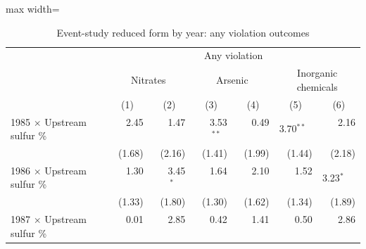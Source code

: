 \begin{table}[htbp]
\raggedright
\begin{minipage}{\linewidth}
\caption{\label{tab:es_rf_coefs_allcat_k2} Event-study reduced form by year: any violation outcomes}
\end{minipage}
\small
{\setlength{\tabcolsep}{4pt}%
\begin{adjustbox}{max width=\linewidth}
\begin{tabular}{lrrrrrr}
\toprule
 & \multicolumn{6}{c}{Any violation} \\
 & \multicolumn{2}{c}{Nitrates} & \multicolumn{2}{c}{Arsenic} & \multicolumn{2}{c}{Inorganic chemicals} \\
 & \multicolumn{1}{c}{(1)} & \multicolumn{1}{c}{(2)} & \multicolumn{1}{c}{(3)} & \multicolumn{1}{c}{(4)} & \multicolumn{1}{c}{(5)} & \multicolumn{1}{c}{(6)} \\
\hline
1985 $\times$ Upstream sulfur \% & \phantom{(}\phantom{-}2.45$^{\phantom{*}\phantom{*}\phantom{*}}$ & \phantom{(}\phantom{-}1.47$^{\phantom{*}\phantom{*}\phantom{*}}$ & \phantom{(}\phantom{-}3.53$^{**\phantom{*}}$ & \phantom{(}\phantom{-}0.49$^{\phantom{*}\phantom{*}\phantom{*}}$ & \phantom{(}\phantom{-}3.70$^{**\phantom{*}}$ & \phantom{(}\phantom{-}2.16$^{\phantom{*}\phantom{*}\phantom{*}}$ \\
 & (\phantom{-}1.68)\phantom{$^{***}$} & (\phantom{-}2.16)\phantom{$^{***}$} & (\phantom{-}1.41)\phantom{$^{***}$} & (\phantom{-}1.99)\phantom{$^{***}$} & (\phantom{-}1.44)\phantom{$^{***}$} & (\phantom{-}2.18)\phantom{$^{***}$} \\
1986 $\times$ Upstream sulfur \% & \phantom{(}\phantom{-}1.30$^{\phantom{*}\phantom{*}\phantom{*}}$ & \phantom{(}\phantom{-}3.45$^{*\phantom{*}\phantom{*}}$ & \phantom{(}\phantom{-}1.64$^{\phantom{*}\phantom{*}\phantom{*}}$ & \phantom{(}\phantom{-}2.10$^{\phantom{*}\phantom{*}\phantom{*}}$ & \phantom{(}\phantom{-}1.52$^{\phantom{*}\phantom{*}\phantom{*}}$ & \phantom{(}\phantom{-}3.23$^{*\phantom{*}\phantom{*}}$ \\
 & (\phantom{-}1.33)\phantom{$^{***}$} & (\phantom{-}1.80)\phantom{$^{***}$} & (\phantom{-}1.30)\phantom{$^{***}$} & (\phantom{-}1.62)\phantom{$^{***}$} & (\phantom{-}1.34)\phantom{$^{***}$} & (\phantom{-}1.89)\phantom{$^{***}$} \\
1987 $\times$ Upstream sulfur \% & \phantom{(}\phantom{-}0.01$^{\phantom{*}\phantom{*}\phantom{*}}$ & \phantom{(}\phantom{-}2.85$^{\phantom{*}\phantom{*}\phantom{*}}$ & \phantom{(}\phantom{-}0.42$^{\phantom{*}\phantom{*}\phantom{*}}$ & \phantom{(}\phantom{-}1.41$^{\phantom{*}\phantom{*}\phantom{*}}$ & \phantom{(}\phantom{-}0.50$^{\phantom{*}\phantom{*}\phantom{*}}$ & \phantom{(}\phantom{-}2.86$^{\phantom{*}\phantom{*}\phantom{*}}$ \\

\end{tabular}
\end{adjustbox}}
\end{table}
